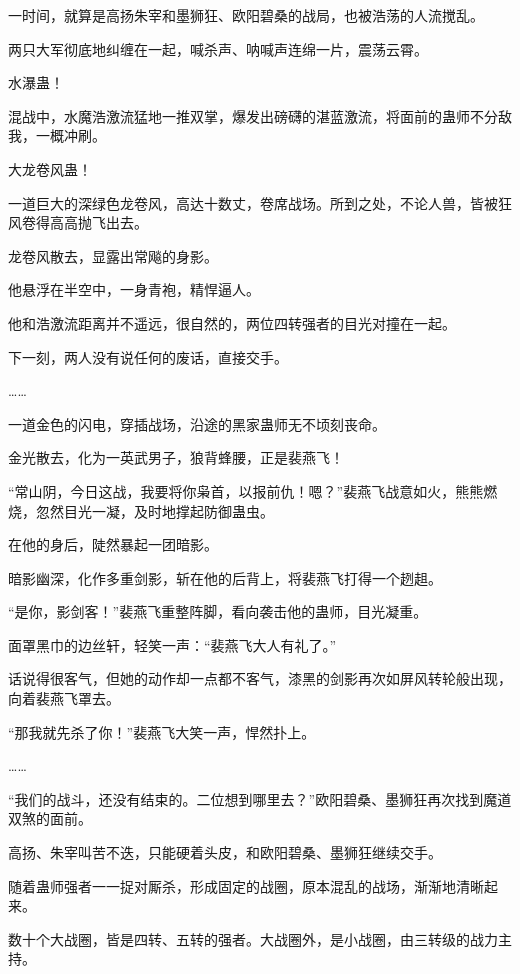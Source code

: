 
\begin{this_body}



一时间，就算是高扬朱宰和墨狮狂、欧阳碧桑的战局，也被浩荡的人流搅乱。

两只大军彻底地纠缠在一起，喊杀声、呐喊声连绵一片，震荡云霄。

水瀑蛊！

混战中，水魔浩激流猛地一推双掌，爆发出磅礴的湛蓝激流，将面前的蛊师不分敌我，一概冲刷。

大龙卷风蛊！

一道巨大的深绿色龙卷风，高达十数丈，卷席战场。所到之处，不论人兽，皆被狂风卷得高高抛飞出去。

龙卷风散去，显露出常飚的身影。

他悬浮在半空中，一身青袍，精悍逼人。

他和浩激流距离并不遥远，很自然的，两位四转强者的目光对撞在一起。

下一刻，两人没有说任何的废话，直接交手。

……

一道金色的闪电，穿插战场，沿途的黑家蛊师无不顷刻丧命。

金光散去，化为一英武男子，狼背蜂腰，正是裴燕飞！

“常山阴，今日这战，我要将你枭首，以报前仇！嗯？”裴燕飞战意如火，熊熊燃烧，忽然目光一凝，及时地撑起防御蛊虫。

在他的身后，陡然暴起一团暗影。

暗影幽深，化作多重剑影，斩在他的后背上，将裴燕飞打得一个趔趄。

“是你，影剑客！”裴燕飞重整阵脚，看向袭击他的蛊师，目光凝重。

面罩黑巾的边丝轩，轻笑一声：“裴燕飞大人有礼了。”

话说得很客气，但她的动作却一点都不客气，漆黑的剑影再次如屏风转轮般出现，向着裴燕飞罩去。

“那我就先杀了你！”裴燕飞大笑一声，悍然扑上。

……

“我们的战斗，还没有结束的。二位想到哪里去？”欧阳碧桑、墨狮狂再次找到魔道双煞的面前。

高扬、朱宰叫苦不迭，只能硬着头皮，和欧阳碧桑、墨狮狂继续交手。

随着蛊师强者一一捉对厮杀，形成固定的战圈，原本混乱的战场，渐渐地清晰起来。

数十个大战圈，皆是四转、五转的强者。大战圈外，是小战圈，由三转级的战力主持。


\end{this_body}
